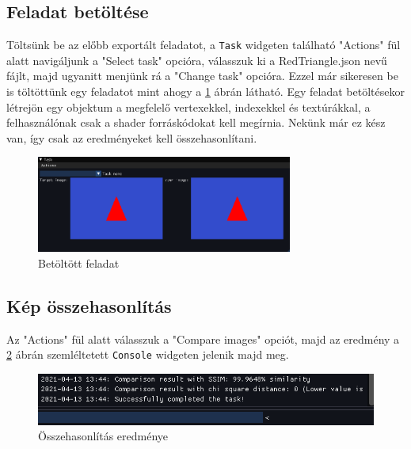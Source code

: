 \subsection{Feladat betöltése}

Töltsünk be az előbb exportált feladatot, a \verb"Task" widgeten található "Actions" fül alatt navigáljunk a "Select task" opcióra, válasszuk ki a RedTriangle.json nevű fájlt, majd ugyanitt menjünk rá a "Change task" opcióra. Ezzel már sikeresen be is töltöttünk egy feladatot mint ahogy a \ref{fig:taskwidget} ábrán látható. Egy feladat betöltésekor létrejön egy objektum a megfelelő vertexekkel, indexekkel és textúrákkal, a felhasználónak csak a shader forráskódokat kell megírnia. Nekünk már ez kész van, így csak az eredményeket kell összehasonlítani.

\begin{figure}[hbt!]
    \centering
    \includegraphics[width=0.75\textwidth,height=\textheight/2,keepaspectratio]
    {resources/Showcase/slimshady_taskwidget.png}
    \caption{Betöltött feladat}
    \label{fig:taskwidget}
\end{figure}

\subsection{Kép összehasonlítás}

Az "Actions" fül alatt válasszuk a "Compare images" opciót, majd az eredmény a \ref{fig:console} ábrán szemléltetett \verb|Console| widgeten jelenik majd meg.

\begin{figure}[hbt!]
    \centering
    \includegraphics[width=\textwidth,height=\textheight,keepaspectratio]
    {resources/Showcase/slimshady_comparisonresult.png}
    \caption{Összehasonlítás eredménye}
    \label{fig:console}
\end{figure}

